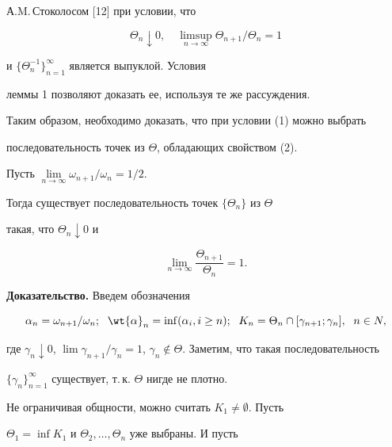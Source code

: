 А.M.\,Сто\-ко\-ло\-сом [12] при условии, что


$$


\Theta_n\downarrow 0,\quad


\limsup_{n \to \infty} \Theta_{n+1} / \Theta_n=1


$$


и $\{\Theta_n^{-1} \}_{n=1}^{\infty}$ является выпуклой. Условия


леммы 1 позволяют доказать ее, используя те же рассуждения.





Таким образом, необходимо доказать, что при условии (1) можно выбрать


последовательность точек из $\Theta$, обладающих свойством (2).





\begin{lem}


Пусть $\lim\limits_{n \to \infty} \omega_{n+1} / \omega_n =1 / 2$.


Тогда существует последовательность точек $\{\Theta_n\}$ из $\Theta$


такая, что $\Theta_n \downarrow 0$ и


$$


\lim_{n \to \infty} \frac {\Theta_{n+1}} {\Theta_n} =1.


$$


\end{lem}





{\bf Доказательство.} Введем обозначения


$$


\alpha_n= \omega_{n+1} / \omega_n;\ \;


\wt {\alpha} _n =\inf (\alpha_i, i \ge n);\ \; K_n= \Theta_n \cap


[ \gamma_{n+1}; \gamma_n ],\ \; n \in N,


$$


где $\gamma_n \downarrow 0$, $\lim \gamma_{n+1} /


\gamma_n =1$, $\gamma_n \notin \Theta$. Заметим, что такая последовательность


$\{\gamma_n \}_{n=1}^{\infty}$ существует, т.\,к. $\Theta$ нигде не плотно.


Не ограничивая общности, можно считать $K_1 \ne \emptyset$. Пусть


$\Theta_1 = \inf K_1 $ и $\Theta_2,\dotsc,\Theta_n$ уже выбраны. И пусть



